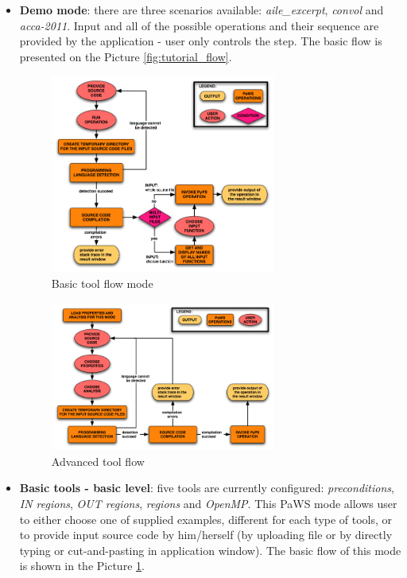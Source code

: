\begin{itemize}
  \item {\bf Demo mode}: there are three scenarios available: \emph{aile\_excerpt}, \emph{convol} and \emph{acca-2011}. Input and all of the possible operations and their sequence are provided by the application - user only controls the step. The basic flow is presented on the Picture \ref{fig:tutorial_flow}.
  
  \begin{figure}[h!]
  \centering
  \includegraphics[width=0.7\textwidth]{reportCh2/basic_tool_flow}
  \caption{Basic tool flow mode}
  \label{fig:basic_tool_flow}
\end{figure}

\begin{figure}[h!]
  \centering
  \includegraphics[width=0.7\textwidth]{reportCh2/advanced_tool_flow}
  \caption{Advanced tool flow}
  \label{fig:advanced_tool_flow}
\end{figure}
  
  \item {\bf Basic tools - basic level}: five tools are currently configured: \emph{preconditions}, \emph{IN regions}, \emph{OUT regions}, \emph{regions} and \emph{OpenMP}. This PaWS mode allows user to either choose one of supplied examples, different for each type of tools, or to provide input source code by him/herself (by uploading file or by directly typing or cut-and-pasting in application window). The basic flow of this mode is shown in the Picture \ref{fig:basic_tool_flow}.


\end{itemize}
